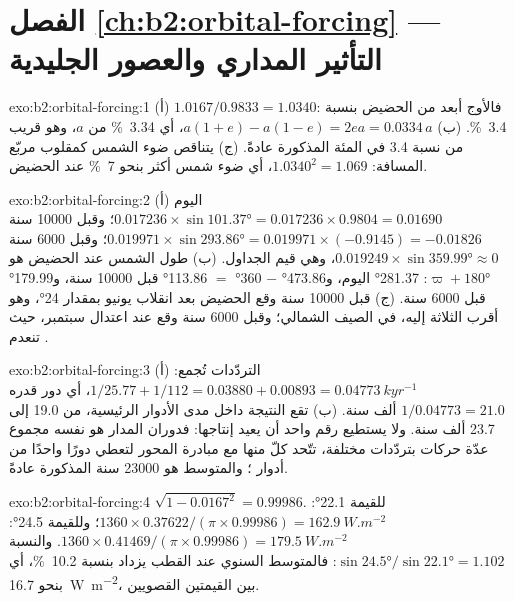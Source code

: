 \section*{الفصل \ref{ch:b2:orbital-forcing} --- التأثير المداري والعصور الجليدية}

\begin{solution}{exo:b2:orbital-forcing:1}
(أ) $1.0167/0.9833 = 1.0340$: فالأوج أبعد من الحضيض بنسبة \qty{3.4}{\percent}.
(ب) $a(1 + e) - a(1 - e) = 2ea = 0.0334\,a$، أي \qty{3.34}{\percent} من $a$، وهو قريب من نسبة 3.4 في المئة
المذكورة عادةً. (ج) يتناقص ضوء الشمس كمقلوب مربّع المسافة: $1.0340^2 = 1.069$،
أي ضوء شمس أكثر بنحو \qty{7}{\percent} عند الحضيض.
\end{solution}

\begin{solution}{exo:b2:orbital-forcing:2}
(أ) اليوم $0.017236 \times \sin\ang{101.37} = 0.017236 \times 0.9804 = 0.01690$؛ وقبل \num{10000} سنة
$0.019971 \times \sin\ang{293.86} = 0.019971 \times (-0.9145) = -0.01826$؛ وقبل \num{6000} سنة
$0.019249 \times \sin\ang{359.99} \approx 0$، وهي قيم الجداول. (ب) طول الشمس عند
الحضيض هو $\varpi + \ang{180}$: \ang{281.37} اليوم، و\ang{473.86} $-$ \ang{360} $=$ \ang{113.86}
قبل \num{10000} سنة، و\ang{179.99} قبل \num{6000} سنة. (ج) قبل \num{10000} سنة وقع الحضيض
بعد انقلاب يونيو بمقدار \ang{24}، وهو أقرب الثلاثة إليه، في الصيف الشمالي؛
وقبل \num{6000} سنة وقع عند اعتدال سبتمبر، حيث تنعدم .
\end{solution}

\begin{solution}{exo:b2:orbital-forcing:3}
(أ) التردّدات تُجمع: $1/25.77 + 1/112 = 0.03880 + 0.00893 = \qty{0.04773}{kyr^{-1}}$، أي دور
قدره $1/0.04773 = 21.0$ ألف سنة. (ب) تقع النتيجة داخل مدى الأدوار الرئيسية،
من 19.0 إلى 23.7 ألف سنة. ولا يستطيع رقم واحد أن يعيد إنتاجها: فدوران المدار
هو نفسه مجموع عدّة حركات بتردّدات مختلفة، تتّحد كلّ منها مع
مبادرة المحور لتعطي دورًا واحدًا من أدوار ؛ والمتوسط هو
\num{23000} سنة المذكورة عادةً.
\end{solution}

\begin{solution}{exo:b2:orbital-forcing:4}
$\sqrt{1 - 0.0167^2} = 0.99986$. للقيمة \ang{22.1}: $1360 \times 0.37622/(\pi \times 0.99986) =
\qty{162.9}{W.m^{-2}}$؛ وللقيمة \ang{24.5}: $1360 \times 0.41469/(\pi \times 0.99986) =
\qty{179.5}{W.m^{-2}}$. والنسبة $\sin\ang{24.5}/\sin\ang{22.1} = 1.102$: فالمتوسط السنوي عند
القطب يزداد بنسبة \qty{10.2}{\percent}، أي بنحو \qty{16.7}{W.m^{-2}}، بين القيمتين القصويين.
\end{solution}

